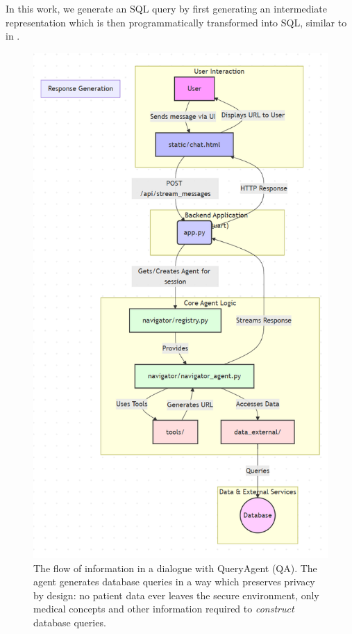 \documentclass[11pt]{article}
\begin{document}
In this work, we generate an SQL query by first generating an intermediate representation which is then programmatically transformed into SQL, similar to in \cite{guo_towards_2019}.


\begin{figure}[t]
  \includegraphics[width=0.9\columnwidth]{content/flow_diagram.PNG}
	\caption{The flow of information in a dialogue with QueryAgent (QA). The agent generates database queries in a way which preserves privacy by design: no patient data ever leaves the secure environment, only medical concepts and other information required to \textit{construct} database queries.} 
  \label{fig:flow-diagram}
\end{figure}
\end{document}
